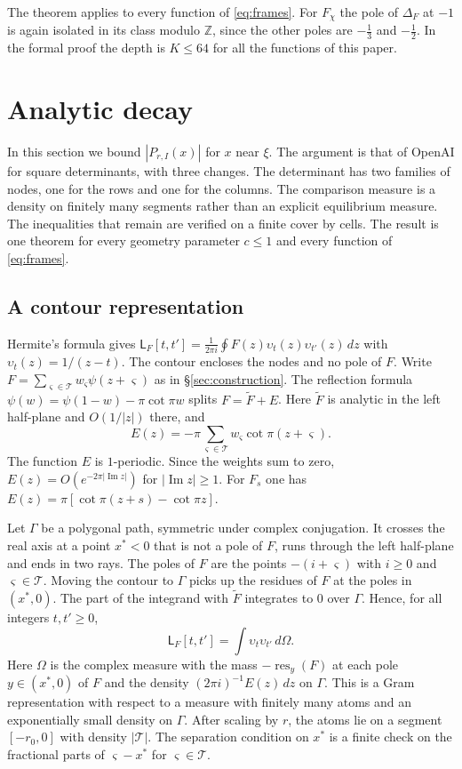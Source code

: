 \documentclass[11pt]{amsart}
\theoremstyle{definition}
\theoremstyle{remark}
\numberwithin{equation}{section}
\newcommand{\Z}{\mathbb Z}
\renewcommand{\Im}{\operatorname{Im}}
\newcommand{\Lw}{\mathsf L}          %
\begin{document}
The theorem applies to every function of \eqref{eq:frames}. For $F_\chi$ the pole of $\Delta_F$ at $-1$ is again isolated
in its class modulo $\Z$, since the other poles are $-\frac13$ and $-\frac12$. In the formal proof the depth is $K\le64$
for all the functions of this paper.

\section{Analytic decay}\label{sec:decay}

In this section we bound $|P_{r,I}(x)|$ for $x$ near $\xi$. The argument is that of OpenAI \cite{OpenAI2026} for square
determinants, with three changes. The determinant has two families of nodes, one for the rows and one for the columns.
The comparison measure is a density on finitely many segments rather than an explicit equilibrium measure. The
inequalities that remain are verified on a finite cover by cells. The result is one theorem for every geometry parameter
$c\le1$ and every function of \eqref{eq:frames}.

\subsection{A contour representation}
Hermite's formula gives $\Lw_F[t,t']=\frac1{2\pi i}\oint F(z)\upsilon_t(z)\upsilon_{t'}(z)\,dz$ with
$\upsilon_t(z)=1/(z-t)$. The contour encloses the nodes and no pole of $F$. Write
$F=\sum_{\varsigma\in\mathcal T}w_\varsigma\psi(z+\varsigma)$ as in \S\ref{sec:construction}. The reflection formula
$\psi(w)=\psi(1-w)-\pi\cot\pi w$ splits $F=\tilde F+E$. Here $\tilde F$ is analytic in the left half-plane and
$O(1/|z|)$ there, and
\[
 E(z)=-\pi\sum_{\varsigma\in\mathcal T}w_\varsigma\cot\pi(z+\varsigma).
\]
The function $E$ is $1$-periodic. Since the weights sum to zero, $E(z)=O(e^{-2\pi|\Im z|})$ for $|\Im z|\ge1$. For
$F_s$ one has $E(z)=\pi[\cot\pi(z+s)-\cot\pi z]$.

Let $\Gamma$ be a polygonal path, symmetric under complex conjugation. It crosses the real axis at a point $x^*<0$ that
is not a pole of $F$, runs through the left half-plane and ends in two rays. The poles of $F$ are the points
$-(i+\varsigma)$ with $i\ge0$ and $\varsigma\in\mathcal T$. Moving the contour to $\Gamma$ picks up the residues of $F$
at the poles in $(x^*,0)$. The part of the integrand with $\tilde F$ integrates to $0$ over $\Gamma$. Hence, for all
integers $t,t'\ge0$,
\begin{equation}\label{eq:gram}
 \Lw_F[t,t']=\int\upsilon_t\upsilon_{t'}\,d\Omega .
\end{equation}
Here $\Omega$ is the complex measure with the mass $-\operatorname{res}_y(F)$ at each pole $y\in(x^*,0)$ of $F$ and the
density $(2\pi i)^{-1}E(z)\,dz$ on $\Gamma$. This is a Gram representation with respect to a measure with finitely many
atoms and an exponentially small density on $\Gamma$. After scaling by $r$, the atoms lie on a segment $[-r_0,0]$ with
density $|\mathcal T|$. The separation condition on $x^*$ is a finite check on the fractional parts of $\varsigma-x^*$
for $\varsigma\in\mathcal T$.
\end{document}
